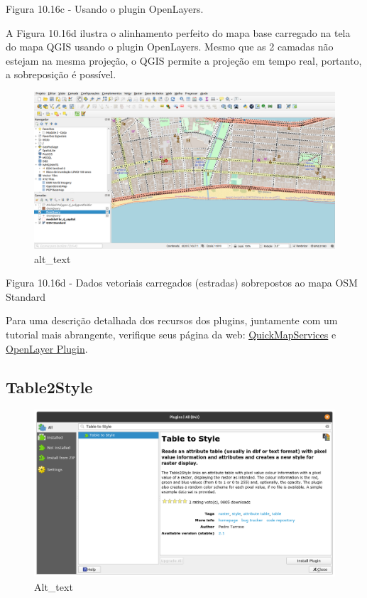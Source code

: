 \documentclass[
  portuguese,
]{krantz}
\begin{document}
Figura 10.16c - Usando o plugin OpenLayers.

A Figura 10.16d ilustra o alinhamento perfeito do mapa base carregado na tela do mapa QGIS usando o plugin OpenLayers. Mesmo que as 2 camadas não estejam na mesma projeção, o QGIS permite a projeção em tempo real, portanto, a sobreposição é possível.

\begin{figure}
\centering
\includegraphics{media/modulo10/fig1016_d.png}
\caption{alt\_text}
\end{figure}

Figura 10.16d - Dados vetoriais carregados (estradas) sobrepostos ao mapa OSM Standard

Para uma descrição detalhada dos recursos dos plugins, juntamente com um tutorial mais abrangente, verifique seus página da web: \href{https://nextgis.com/blog/quickmapservices/}{QuickMapServices} e \href{https://github.com/sourcepole/qgis-openlayers-plugin}{OpenLayer Plugin}.

\hypertarget{table2style}{%
\subsection{\texorpdfstring{\textbf{Table2Style}}{Table2Style}}\label{table2style}}

\begin{figure}
\centering
\includegraphics{media/modulo10/fig1017_a.png}
\caption{Alt\_text}
\end{figure}
\end{document}
